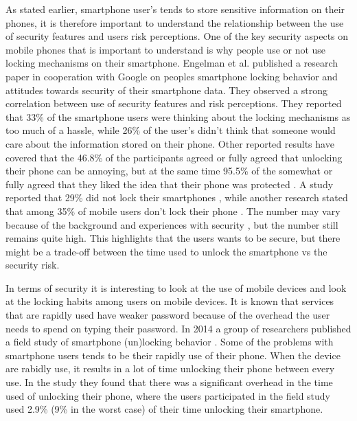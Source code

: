   As stated earlier, smartphone user's tends to store sensitive information on their phones, it is therefore important to understand the relationship between the use of security features and users risk perceptions. One of the key security aspects on mobile phones that is important to understand is why people use or not use locking mechanisms on their smartphone. Engelman et al. \cite{Egelman} published a research paper in cooperation with Google on peoples smartphone locking behavior and attitudes towards security of their smartphone data. They observed a strong correlation between use of security features and risk perceptions. They reported that 33\% of the smartphone users were thinking about the locking mechanisms as too much of a hassle, while 26\% of the user's didn't think that someone would care about the information stored on their phone.  Other reported results have covered that the 46.8\% of the participants agreed or fully agreed that unlocking their phone can be annoying, but at the same time 95.5\% of the somewhat or fully agreed that they liked the idea that their phone was protected \cite{habits3}. A study reported that 29\% did not lock their smartphones \cite{MobileUseage}, while another research stated that among 35\% of mobile users don't lock their phone \cite{Bruggen}. The number may vary because of the background and experiences with security , but the number still remains quite high. This highlights that the users wants to be secure, but there might be a trade-off between the time used to unlock the smartphone vs the security risk. 

  In terms of security it is interesting to look at the use of mobile devices and look at the locking habits among users on mobile devices. It is known that services that are rapidly used have weaker password because of the overhead the user needs to spend on typing their password. In 2014 a group of researchers published a field study of smartphone (un)locking behavior \cite{habits3}. Some of the problems with smartphone users tends to be their rapidly use of their phone. When the device are rabidly use, it results in a lot of time unlocking their phone between every use. In the study they found that there was a significant overhead in the time used of unlocking their phone, where the users participated in the field study used 2.9\% (9\% in the worst case) of their time unlocking their smartphone. 

